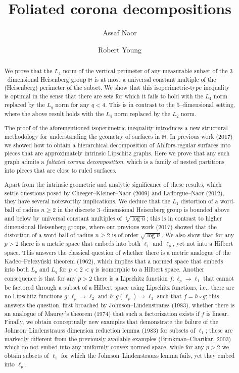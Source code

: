 \documentclass[11pt,reqno]{amsart}
\title{Foliated corona decompositions}
\author[Assaf Naor]{Assaf Naor}
\author[Robert Young]{Robert Young}
\renewcommand{\H}{\mathbb{H}}
\newcommand{\0}{\mathbf{0}}
\renewcommand{\1}{\mathbf 1}
\newcommand{\from}{\colon}
\renewcommand{\ge}{\geqslant}
\theoremstyle{remark}
\begin{document}
\begin{abstract}
We prove that the $L_4$ norm of the vertical perimeter of any measurable subset of the $3$--dimensional Heisenberg group $\H$ is at most a universal constant multiple of the (Heisenberg) perimeter of the subset. We show that this isoperimetric-type inequality is optimal in the sense that there are sets for which it fails to hold with the $L_4$ norm replaced by the $L_q$ norm for any $q<4$. This  is in contrast to the $5$--dimensional setting, where the above result holds with the $L_4$ norm replaced by the $L_2$ norm.

The proof of the aforementioned isoperimetric inequality introduces a new structural methodology for understanding the geometry of surfaces in $\H$. In previous work (2017) we showed how to obtain a hierarchical decomposition of Ahlfors-regular surfaces into pieces that are approximately intrinsic Lipschitz graphs.  Here we prove that any such graph admits a {\em foliated corona decomposition}, which is a family of nested partitions into pieces that are close to ruled surfaces.

Apart from the intrinsic geometric and analytic significance of these results, which settle questions posed by  Cheeger--Kleiner--Naor (2009) and Lafforgue--Naor (2012), they have several noteworthy implications. We deduce that the $L_1$ distortion of a word-ball of radius $n\ge 2$ in the discrete $3$--dimensional Heisenberg group is bounded above and below by universal constant multiples of $\sqrt[4]{\log n}$; this is in contrast to  higher dimensional Heisenberg groups, where our previous work (2017) showed that the distortion of a word-ball of radius $n\ge 2$ is of order $\sqrt{\log n}$. We also show that for any $p>2$ there is a metric space that embeds into both $\ell_1$ and $\ell_p$, yet not into a Hilbert space.  This answers the classical question of whether there is a metric analogue of the Kadec--Pe{\l}czy\'nski theorem (1962), which implies that a normed space that embeds into both $L_p$ and $L_q$ for $p<2<q$ is isomorphic to a Hilbert space. Another consequence is that for any $p>2$ there is a Lipschitz function $f\from\ell_p\to \ell_1$ that cannot be factored through a subset of a Hilbert space using Lipschitz functions, i.e., there are no Lipschitz functions $g\from\ell_p\to \ell_2$ and $h\from g(\ell_p)\to \ell_1$ such that $f=h\circ g$; this answers the question, first broached by Johnson--Lindenstrauss (1983), whether there is an analogue of Maurey's theorem  (1974)  that such a factorization  exists if $f$ is linear. Finally, we obtain conceptually new examples that demonstrate  the failure of the Johnson--Lindenstrauss dimension reduction lemma (1983) for subsets of $\ell_1$; these are markedly different from the previously available examples (Brinkman--Charikar, 2003) which do not embed into any uniformly convex normed space, while for any $p>2$ we obtain subsets of $\ell_1$ for which the Johnson--Lindenstrauss lemma fails, yet they  embed into $\ell_p$.
\end{abstract}
\end{document}

